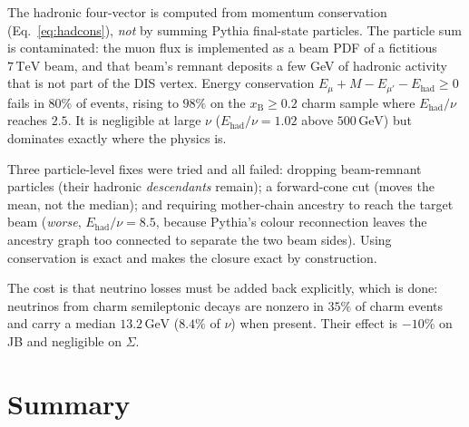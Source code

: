 \documentclass[11pt,a4paper]{article}
\newcommand{\xB}{x_{\mathrm{B}}}
\newcommand{\Ein}{E_{\mu}}
\newcommand{\Eout}{E_{\mu'}}
\newcommand{\Ehad}{E_{\mathrm{had}}}
\newcommand{\GeV}{\,\mathrm{GeV}}
\begin{document}
The hadronic four-vector is computed from momentum conservation
(Eq.~\ref{eq:hadcons}), \emph{not} by summing Pythia final-state particles. The
particle sum is contaminated: the muon flux is implemented as a beam PDF of a
fictitious $7\,\mathrm{TeV}$ beam, and that beam's remnant deposits a few GeV of hadronic
activity that is not part of the DIS vertex. Energy conservation
$\Ein+M-\Eout-\Ehad\geq0$ fails in $80\%$ of events, rising to $98\%$ on the
$\xB\geq0.2$ charm sample where $\Ehad/\nu$ reaches $2.5$. It is negligible at
large $\nu$ ($\Ehad/\nu=1.02$ above $500\GeV$) but dominates exactly where the
physics is.

Three particle-level fixes were tried and all failed: dropping beam-remnant
particles (their hadronic \emph{descendants} remain); a forward-cone cut (moves
the mean, not the median); and requiring mother-chain ancestry to reach the
target beam (\emph{worse}, $\Ehad/\nu=8.5$, because Pythia's colour reconnection
leaves the ancestry graph too connected to separate the two beam sides). Using
conservation is exact and makes the closure exact by construction.

The cost is that neutrino losses must be added back explicitly, which is done:
neutrinos from charm semileptonic decays are nonzero in $35\%$ of charm events
and carry a median $13.2\GeV$ ($8.4\%$ of $\nu$) when present. Their effect is
$-10\%$ on JB and negligible on $\Sigma$.

\section{Summary}
\end{document}
